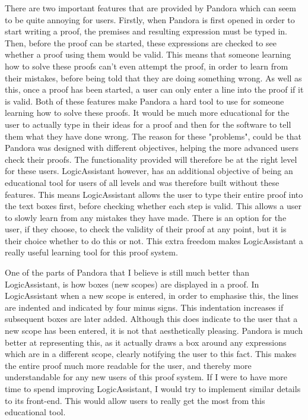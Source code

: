 There are two important features that are provided by Pandora which can seem to be quite annoying for users. Firstly, when Pandora is first opened in order to start writing a proof, the premises and resulting expression must be typed in. Then, before the proof can be started, these expressions are checked to see whether a proof using them would be valid. This means that someone learning how to solve these proofs can't even attempt the proof, in order to learn from their mistakes, before being told that they are doing something wrong. As well as this, once a proof has been started, a user can only enter a line into the proof if it is valid. Both of these features make Pandora a hard tool to use for someone learning how to solve these proofs. It would be much more educational for the user to actually type in their ideas for a proof and then for the software to tell them what they have done wrong. The reason for these "problems", could be that Pandora was designed with different objectives, helping the more advanced users check their proofs. The functionality provided will therefore be at the right level for these users.  LogicAssistant however, has an additional objective of being an educational tool for users of all levels and was therefore built without these features. This means LogicAssistant allows the user to type their entire proof into the text boxes first, before checking whether each step is valid. This allows a user to slowly learn from any mistakes they have made. There is an option for the user, if they choose, to check the validity of their proof at any point, but it is their choice whether to do this or not. This extra freedom makes LogicAssistant a really useful learning tool for this proof system. 

One of the parts of Pandora that I believe is still much better than LogicAssistant, is how boxes (new scopes) are displayed in a proof. In LogicAssistant when a new scope is entered, in order to emphasise this, the lines are indented and indicated by four minus signs. This indentation increases if subsequent boxes are later added. Although this does indicate to the user that a new scope has been entered, it is not that aesthetically pleasing. Pandora is much better at representing this, as it actually draws a box around any expressions which are in a different scope, clearly notifying the user to this fact. This makes the entire proof much more readable for the user, and thereby more understandable for any new users of this proof system. If I were to have more time to spend improving LogicAssistant, I would try to implement similar details to its front-end. This would allow users to really get the most from this educational tool. 

